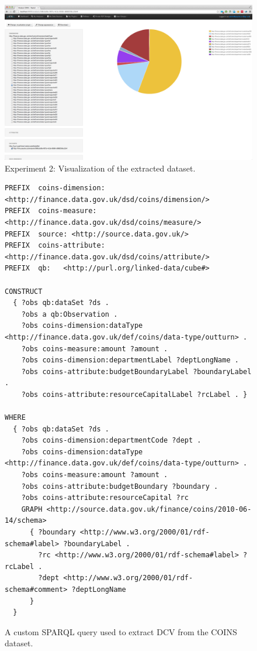 \begin{figure}
  \centering
  \includegraphics[width=140mm]{img/payola-exp-02-result.png}
  \caption{Experiment 2: Visualization of the extracted dataset.}
  \label{fig:payola-exp-02-result}
\end{figure}

\begin{figure}
  \scriptsize
\begin{verbatim}
PREFIX  coins-dimension: <http://finance.data.gov.uk/dsd/coins/dimension/>
PREFIX  coins-measure: <http://finance.data.gov.uk/dsd/coins/measure/>
PREFIX  source: <http://source.data.gov.uk/>
PREFIX  coins-attribute: <http://finance.data.gov.uk/dsd/coins/attribute/>
PREFIX  qb:   <http://purl.org/linked-data/cube#>

CONSTRUCT 
  { ?obs qb:dataSet ?ds .
    ?obs a qb:Observation .
    ?obs coins-dimension:dataType <http://finance.data.gov.uk/def/coins/data-type/outturn> .
    ?obs coins-measure:amount ?amount .
    ?obs coins-dimension:departmentLabel ?deptLongName .
    ?obs coins-attribute:budgetBoundaryLabel ?boundaryLabel .
    ?obs coins-attribute:resourceCapitalLabel ?rcLabel . }

WHERE
  { ?obs qb:dataSet ?ds .
    ?obs coins-dimension:departmentCode ?dept .
    ?obs coins-dimension:dataType <http://finance.data.gov.uk/def/coins/data-type/outturn> .
    ?obs coins-measure:amount ?amount .
    ?obs coins-attribute:budgetBoundary ?boundary .
    ?obs coins-attribute:resourceCapital ?rc
    GRAPH <http://source.data.gov.uk/finance/coins/2010-06-14/schema>
      { ?boundary <http://www.w3.org/2000/01/rdf-schema#label> ?boundaryLabel .
        ?rc <http://www.w3.org/2000/01/rdf-schema#label> ?rcLabel .
        ?dept <http://www.w3.org/2000/01/rdf-schema#comment> ?deptLongName
      }
  }
\end{verbatim}
\label{fig:custom-coins-query}
\caption{A custom SPARQL query used to extract DCV from the COINS dataset.}
\end{figure}

